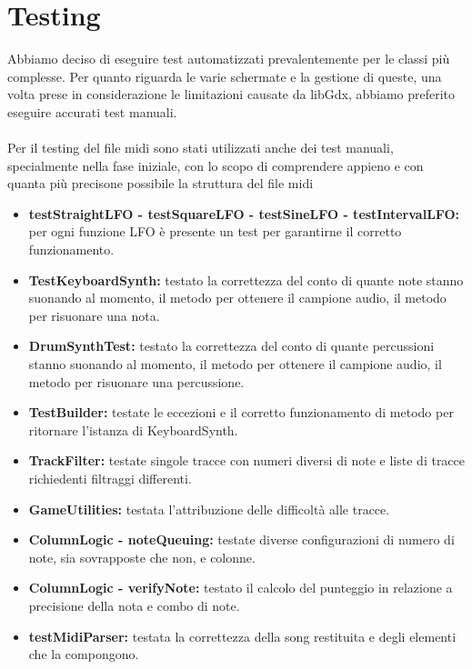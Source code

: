 \documentclass[a4paper,12pt]{report}
\begin{document}
\section{Testing}
Abbiamo deciso di eseguire test automatizzati prevalentemente per le classi più complesse. Per quanto riguarda le varie schermate e la gestione di queste, una volta prese in considerazione le limitazioni causate da libGdx, abbiamo preferito eseguire accurati test manuali. \\ \\ Per il testing del file midi sono stati utilizzati anche dei test manuali, specialmente nella fase iniziale, con lo scopo di comprendere appieno e con quanta più precisone possibile la struttura del file midi \\
{
\begin{itemize}
	\begingroup
	\fontsize{10pt}{12pt}\selectfont	
	\item \textbf{testStraightLFO - testSquareLFO - testSineLFO - testIntervalLFO:} per ogni funzione LFO è presente un test per garantirne il corretto funzionamento.	
	\item \textbf{TestKeyboardSynth:} testato la correttezza del conto di quante note stanno suonando al momento, il metodo per ottenere il campione audio, il metodo per risuonare una nota.	
	\item \textbf{DrumSynthTest:} testato la correttezza del conto di quante percussioni stanno suonando al momento, il metodo per ottenere il campione audio, il metodo per risuonare una percussione.	
	\item \textbf{TestBuilder:} testate le eccezioni e il corretto funzionamento di metodo per ritornare l'istanza di KeyboardSynth.
	\item \textbf{TrackFilter:} testate singole tracce con numeri diversi di note e liste di tracce richiedenti filtraggi differenti.	
	\item \textbf{GameUtilities:} testata l'attribuzione delle difficoltà alle tracce.	
	\item \textbf{ColumnLogic - noteQueuing:} testate diverse configurazioni di numero di note, sia sovrapposte che non, e colonne.	
	\item \textbf{ColumnLogic - verifyNote:} testato il calcolo del punteggio in relazione a precisione della nota e combo di note.
	\item \textbf{testMidiParser:} testata la correttezza della song restituita e degli elementi che la compongono.
	\endgroup
\end{itemize}
}
\newpage
\end{document}
